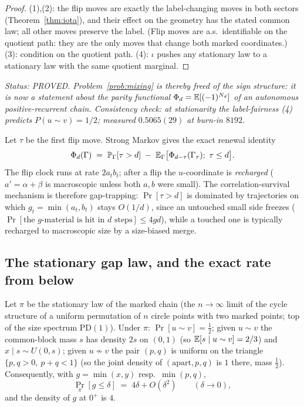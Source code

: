 \begin{proof}
(1),(2): the flip moves are exactly the label-changing moves in both
sectors (Theorem~\ref{thm:iota}), and their effect on the geometry has
the stated common law; all other moves preserve the label.  (Flip
moves are a.s.\ identifiable on the quotient path: they are the only
moves that change both marked coordinates.)  (3):
condition on the quotient path.  (4): $\iota$ pushes any stationary
law to a stationary law with the same quotient marginal.
\end{proof}

\emph{Status: PROVED.  Problem~\ref{prob:mixing} is thereby freed of
the sign structure: it is now a statement about the \emph{parity}
functional $\Phi_d=\mathbb{E}[(-1)^{N_d}]$ of an autonomous
positive-recurrent chain.  Consistency check: at stationarity the
label-fairness (4) predicts $P(u\sim v)=1/2$; measured $0.5065(29)$ at
burn-in $8192$.}

\begin{remark}\label{rem:renewal}
Let $\tau$ be the first flip move.  Strong Markov gives the exact
renewal identity
\[
\Phi_d(\Gamma)\;=\;\mathbb{P}_\Gamma[\tau>d]\;-\;
\mathbb{E}_\Gamma\bigl[\Phi_{d-\tau}(\Gamma_\tau);\ \tau\le d\bigr].
\]
The flip clock runs at rate $2a_tb_t$; after a flip the $u$-coordinate
is \emph{recharged} ($a'=\alpha+\beta$ is macroscopic unless both
$a,b$ were small).  The correlation-survival mechanism is therefore
gap-trapping: $\Pr[\tau>d]$ is dominated by trajectories on which
$g_t=\min(a_t,b_t)$ stays $O(1/d)$, since an untouched small side
freezes ($\Pr[\text{the }g\text{-material is hit in }d\text{ steps}]
\le 4gd$), while a touched one is typically recharged to macroscopic
size by a size-biased merge.
\end{remark}

\subsection{The stationary gap law, and the exact rate from below}
\label{sec:gaplaw}

\begin{proposition}\label{prop:gaplawstat}
Let $\pi$ be the stationary law of the marked chain (the $n\to\infty$
limit of the cycle structure of a uniform permutation of $n$ circle
points with two marked points; top of the size spectrum
$\mathrm{PD}(1)$).  Under $\pi$: $\Pr[u\sim v]=\tfrac12$; given
$u\sim v$ the common-block mass $s$ has density $2s$ on $(0,1)$ (so
$\mathbb{E}[s\mid u\sim v]=2/3$) and $x\mid s\sim U(0,s)$; given $u\not\sim v$
the pair $(p,q)$ is uniform on the triangle $\{p,q>0,\ p+q<1\}$
(so the joint density of $(\text{apart},p,q)$ is $1$ there, mass
$\tfrac12$).  Consequently, with
$g=\min(x,y)$ resp.\ $\min(p,q)$,
\[
\Pr_\pi[g\le\delta]\;=\;4\delta+O(\delta^2)\qquad(\delta\to0),
\]
and the density of $g$ at $0^+$ is $4$.
\end{proposition}

